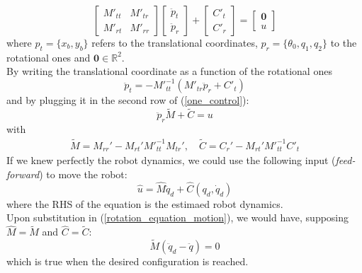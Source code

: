 \documentclass[a4paper,12pt,oneside]{report}
\begin{document}
\begin{equation}
  \begin{bmatrix}
    M'_{tt}&M'_{tr}\\
    M'_{rt}&M'_{rr}
  \end{bmatrix}
  \begin{bmatrix}
    \ddot{p}_t\\
    \ddot{p}_r
  \end{bmatrix}+\begin{bmatrix}
    C'_{t}\\
    C'_{r}
  \end{bmatrix}=\begin{bmatrix}
    \textbf{0}\\
      u
    \end{bmatrix}
    \label{one_control}
\end{equation}
where $p_t=\{x_b,y_b\}$ refers to the translational coordinates, $p_r=\{\theta_0,q_1,q_2\}$ to the rotational ones and $\textbf{0}\in \mathbb{R}^2$.\\
By writing the translational coordinate as a function of the rotational ones
\begin{equation}
  \ddot{p}_t=-{M'}_{tt}^{-1}(M'_{tr}\ddot{p}_r+C'_t)
\end{equation}
and by plugging it in the second row of (\ref{one_control}):
\begin{equation}
  \ddot{p}_r\tilde{M}+\tilde{C}=u
  \label{rotation_equation_motion}
\end{equation}
with
\begin{equation}
\begin{array}{c}
  \tilde{M}=M_{rr}'-M_{rt}'{M'}_{tt}^{-1}M_{tr}', \quad \tilde{C}=C_r'-M_{rt}'{M'}_{tt}^{-1}C'_t
\end{array}
\end{equation}
If we knew perfectly the robot dynamics, we could use the following input (\textit{feed-forward}) to move the robot:
\begin{equation}
  \hat{u}=\hat{M}\ddot{q}_d+\hat{C}(q_d,\dot{q}_d)
\end{equation}
where the RHS of the equation is the estimaed robot dynamics.\\
Upon substitution in (\ref{rotation_equation_motion}), we would have, supposing $\hat{M}=\tilde{M}$ and $\hat{C}=\tilde{C}$:
\begin{equation}
  \tilde{M}(\ddot{q}_d-\ddot{q})=0
\end{equation}
which is true when the desired configuration is reached.\\
\end{document}
